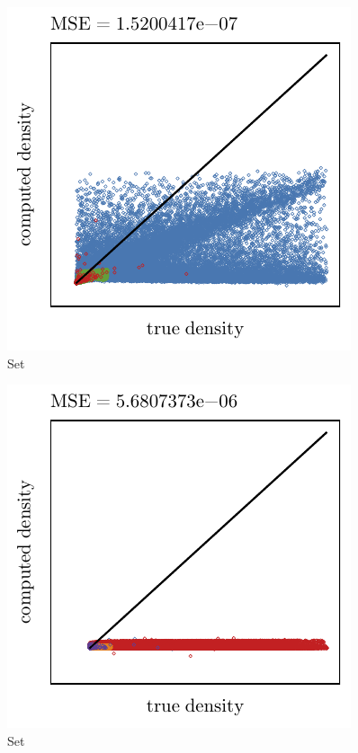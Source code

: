 \begin{subfigure}{0.3\textwidth}
	\centering
	\includegraphics[keepaspectratio=true, width=\textwidth, height=0.23\textheight]{4/img/results_baakman_2_60000_sambe_breiman.pdf}
	\caption{Set \baakmanTwo}
	\label{fig:4:simulated:datasets:sambe:baakman2}
\end{subfigure}	
\begin{subfigure}{0.3\textwidth}
	\centering
	\includegraphics[keepaspectratio=true, width=\textwidth, height=0.23\textheight]{4/img/results_baakman_3_120000_sambe_breiman.pdf}
	\caption{Set \baakmanThree}
	\label{fig:4:simulated:datasets:sambe:baakman3}
\end{subfigure}				
